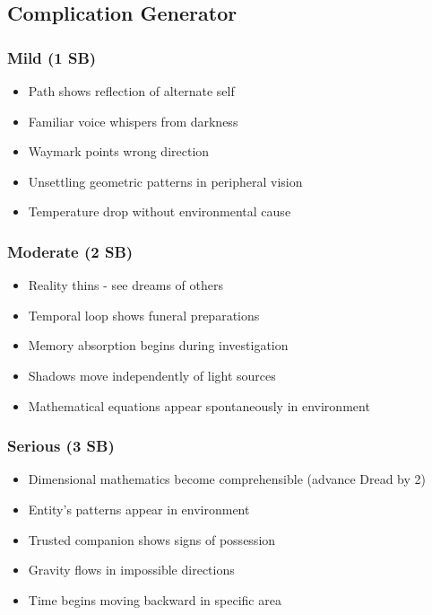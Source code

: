\documentclass[11pt]{article}
\begin{document}
\subsection{Complication Generator}

\subsubsection{Mild (1 SB)}
\begin{itemize}
\item Path shows reflection of alternate self
\item Familiar voice whispers from darkness
\item Waymark points wrong direction
\item Unsettling geometric patterns in peripheral vision
\item Temperature drop without environmental cause
\end{itemize}

\subsubsection{Moderate (2 SB)}
\begin{itemize}
\item Reality thins - see dreams of others
\item Temporal loop shows funeral preparations
\item Memory absorption begins during investigation
\item Shadows move independently of light sources
\item Mathematical equations appear spontaneously in environment
\end{itemize}

\subsubsection{Serious (3 SB)}
\begin{itemize}
\item Dimensional mathematics become comprehensible (advance Dread by 2)
\item Entity's patterns appear in environment
\item Trusted companion shows signs of possession
\item Gravity flows in impossible directions
\item Time begins moving backward in specific area
\end{itemize}
\end{document}
